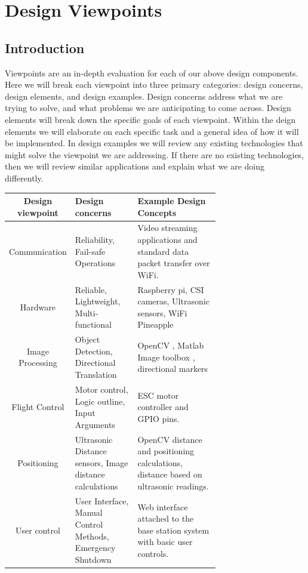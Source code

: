 \documentclass[onecolumn, draftclsnofoot,10pt, compsoc]{IEEEtran}
\begin{document}
\section{Design Viewpoints} %

\subsection{Introduction}  
	Viewpoints are an in-depth evaluation for each of our above design components. Here we will break each viewpoint into three primary categories: design concerns, design elements, and design examples. Design concerns address what we are trying to solve, and what problems we are anticipating to come across. Design elements will break down the specific goals of each viewpoint. Within the deign elements we will elaborate on each specific task and a general idea of how it will be implemented. In design examples we will review any existing technologies that might solve the viewpoint we are addressing. If there are no existing technologies, then we will review similar applications and explain what we are doing differently. 



\begin{center}
    \begin{tabular}{|c|p{0.3\linewidth}|p{0.4\linewidth}|}
        \hline
		Design viewpoint & Design concerns & Example Design Concepts \\
        \hline
		Communication & Reliability, Fail-safe Operations  & Video streaming applications and standard data packet transfer over WiFi.  \\
		\hline 
        Hardware & Reliable, Lightweight, Multi-functional & Raspberry pi, CSI cameras, Ultrasonic sensors, WiFi Pineapple\\
		\hline 
        Image Processing & Object Detection, Directional Translation & OpenCV \cite{r8}, Matlab Image toolbox \cite{r9}, directional markers  \\
		\hline 
        Flight Control & Motor control, Logic outline, Input Arguments  & ESC motor controller and GPIO pins.  \\
		\hline 
        Positioning & Ultrasonic Distance sensors, Image distance calculations  & OpenCV distance and positioning calculations, distance based on ultrasonic readings.  \\
		\hline 
        User control & User Interface, Manual Control Methods, Emergency Shutdown  &  Web interface attached to the base station system with basic user controls. \\
		\hline 
    \end{tabular}
\end{center}
\end{document}
